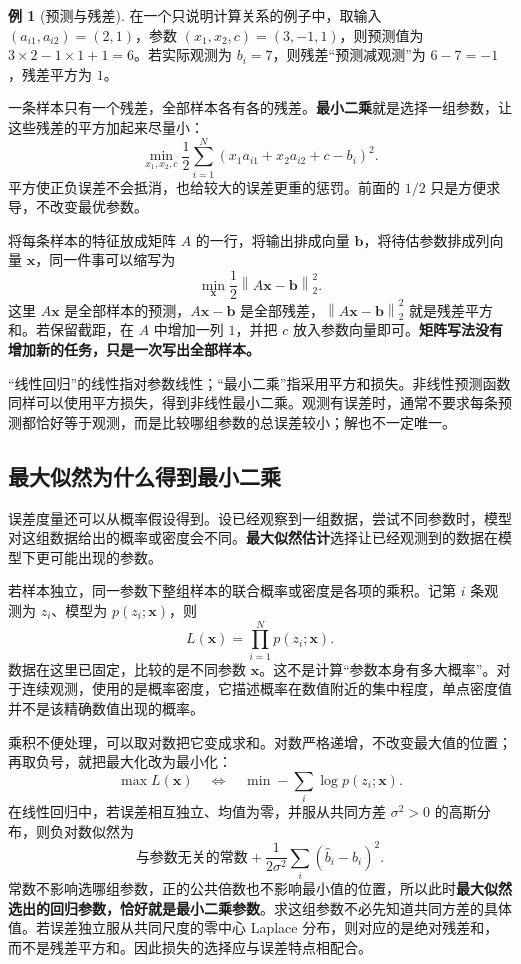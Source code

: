 \documentclass[UTF8,fontset=fandol,a4paper,12pt]{ctexart}
\newcommand{\vx}{\boldsymbol x}
\newcommand{\vb}{\boldsymbol b}
\newcommand{\norm}[1]{\left\lVert#1\right\rVert}
\theoremstyle{definition}
\newtheorem{example}[definition]{例}
\begin{document}
\begin{example}[预测与残差]
在一个只说明计算关系的例子中，取输入 $(a_{i1},a_{i2})=(2,1)$，参数 $(x_1,x_2,c)=(3,-1,1)$，则预测值为 $3\times2-1\times1+1=6$。若实际观测为 $b_i=7$，则残差“预测减观测”为 $6-7=-1$，残差平方为 $1$。
\end{example}
一条样本只有一个残差，全部样本各有各的残差。\textbf{最小二乘}就是选择一组参数，让这些残差的平方加起来尽量小：
\[
 \min_{x_1,x_2,c}\frac12\sum_{i=1}^N
 (x_1a_{i1}+x_2a_{i2}+c-b_i)^2.
\]
平方使正负误差不会抵消，也给较大的误差更重的惩罚。前面的 $1/2$ 只是方便求导，不改变最优参数。

将每条样本的特征放成矩阵 $A$ 的一行，将输出排成向量 $\vb$，将待估参数排成列向量 $\vx$，同一件事可以缩写为
\[
 \boxed{\min_{\vx}\frac12\norm{A\vx-\vb}_2^2.}
\]
这里 $A\vx$ 是全部样本的预测，$A\vx-\vb$ 是全部残差，$\norm{A\vx-\vb}_2^2$ 就是残差平方和。若保留截距，在 $A$ 中增加一列 $1$，并把 $c$ 放入参数向量即可。\textbf{矩阵写法没有增加新的任务，只是一次写出全部样本。}

“线性回归”的线性指对参数线性；“最小二乘”指采用平方和损失。非线性预测函数同样可以使用平方损失，得到非线性最小二乘。观测有误差时，通常不要求每条预测都恰好等于观测，而是比较哪组参数的总误差较小；解也不一定唯一。

\subsection{最大似然为什么得到最小二乘}
误差度量还可以从概率假设得到。设已经观察到一组数据，尝试不同参数时，模型对这组数据给出的概率或密度会不同。\textbf{最大似然估计}选择让已经观测到的数据在模型下更可能出现的参数。

若样本独立，同一参数下整组样本的联合概率或密度是各项的乘积。记第 $i$ 条观测为 $z_i$、模型为 $p(z_i;\vx)$，则
\[
 L(\vx)=\prod_{i=1}^N p(z_i;\vx).
\]
数据在这里已固定，比较的是不同参数 $\vx$。这不是计算“参数本身有多大概率”。对于连续观测，使用的是概率密度，它描述概率在数值附近的集中程度，单点密度值并不是该精确数值出现的概率。

乘积不便处理，可以取对数把它变成求和。对数严格递增，不改变最大值的位置；再取负号，就把最大化改为最小化：
\[
 \max L(\vx)\quad\Longleftrightarrow\quad
 \min -\sum_i\log p(z_i;\vx).
\]
在线性回归中，若误差相互独立、均值为零，并服从共同方差 $\sigma^2>0$ 的高斯分布，则负对数似然为
\[
 \text{与参数无关的常数}
 +\frac1{2\sigma^2}\sum_i(\widehat b_i-b_i)^2.
\]
常数不影响选哪组参数，正的公共倍数也不影响最小值的位置，所以此时\textbf{最大似然选出的回归参数，恰好就是最小二乘参数}。求这组参数不必先知道共同方差的具体值。若误差独立服从共同尺度的零中心 Laplace 分布，则对应的是绝对残差和，而不是残差平方和。因此损失的选择应与误差特点相配合。
\end{document}
